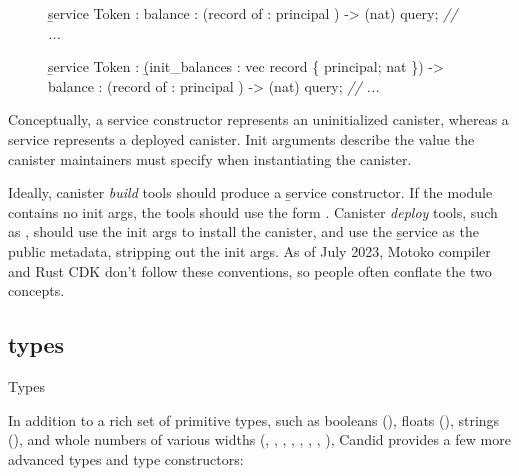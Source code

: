 \documentclass{article}
\begin{document}
\begin{figure}
\begin{code}[candid]
\b{service} Token : {
  balance : (record { of : principal }) -> (nat) query;
  \emph{// ...}
}
\end{code}
\begin{code}[candid]
\b{service} Token : \b{(init_balances : vec record \{ principal; nat \})} -> {
  balance : (record { of : principal }) -> (nat) query;
  \emph{// ...}
}
\end{code}
\end{figure}

Conceptually, a service constructor represents an uninitialized canister, whereas a service represents a deployed canister.
Init arguments describe the value the canister maintainers must specify when instantiating the canister.

Ideally, canister \emph{build} tools should produce a \b{service constructor}.
If the module contains no init args, the tools should use the form .
Canister \emph{deploy} tools, such as \href{https://internetcomputer.org/docs/current/references/cli-reference/dfx-deploy}{}, should use the init args to install the canister, and use the \b{service} as the public metadata, stripping out the init args.
As of July 2023, Motoko compiler and Rust CDK don't follow these conventions, so people often conflate the two concepts.

\subsection{types}{Types}

In addition to a rich set of primitive types, such as booleans (), floats (), strings (), and whole numbers of various widths (, , , , , , , ), Candid provides a few more advanced types and type constructors:
\end{document}
